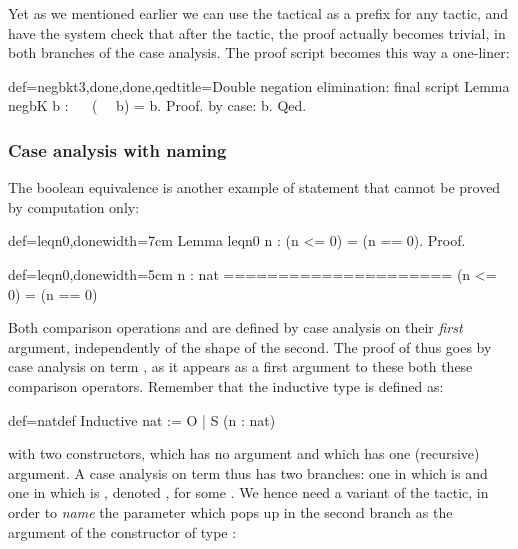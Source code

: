 Yet as we mentioned earlier we can use the  tactical as a
prefix for any tactic, and have the system check that after the
 tactic, the proof actually becomes trivial, in both branches
of the case analysis. The proof script becomes this way a one-liner:

\begin{coq}{def=negbkt3,done,done,qed}{title=Double negation elimination: final script}
Lemma negbK b : ~~ (~~ b) = b.
Proof. by case: b. Qed.
\end{coq}

\subsubsection{Case analysis with naming}

The boolean equivalence  is another example of statement that
cannot be proved by computation only:

\begin{coq}{def=leqn0,done}{width=7cm}
Lemma leqn0 n : (n <= 0) = (n == 0).
Proof.
\end{coq}
\begin{coqout}{def=leqn0,done}{width=5cm}
n : nat
=====================
  (n <= 0) = (n == 0)
\end{coqout}

Both comparison operations \C{<=} and \C{==} are defined by case
analysis on their \emph{first} argument, independently of the shape of
the second. The proof of  thus goes by case analysis on
 term , as it appears as a first argument to these
both these comparison operators.  Remember that the inductive type  is
defined as:

\begin{coq}{def=natdef}{}
Inductive nat := O | S (n : nat)
\end{coq}
with two constructors,  which has no argument and  which has
one (recursive) argument. A case analysis on term  thus
has two branches: one in which  is  and one in which  is
, denoted , for some . We hence need a
variant of the  tactic, in order to \emph{name} the parameter
 which pops up in the second branch as the argument of the 
constructor of type :

